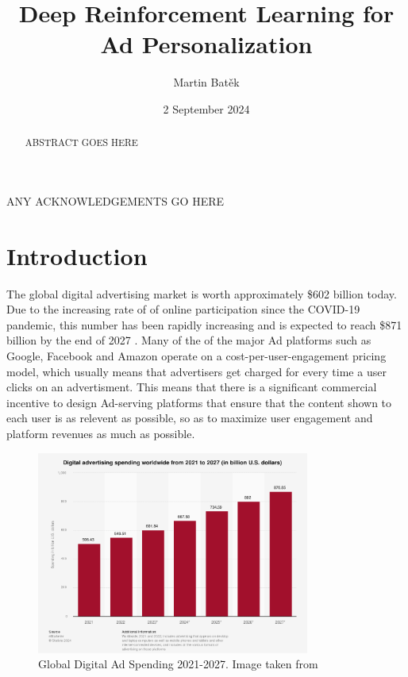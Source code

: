 \documentclass{mldsmsc}
\title{Deep Reinforcement Learning for Ad Personalization}
\author{Martin Bat\v{e}k}
\date{2 September 2024}
\begin{document}
\maketitle


\declaration 


\begin{abstract}
    ABSTRACT GOES HERE
\end{abstract}

\begin{acknowledgements}
    ANY ACKNOWLEDGEMENTS GO HERE
\end{acknowledgements}


\tableofcontents

\mainmatter


\chapter{Introduction}

The global digital advertising market is worth approximately \$602 billion today. Due to the increasing rate of of online participation since the 
COVID-19 pandemic, this number has been rapidly increasing and is expected to reach \$871 billion by the end of 2027 \citep{RefWorks:emarketer2023digital}.
Many of the of the major Ad platforms such as Google, Facebook and Amazon operate on a cost-per-user-engagement pricing model, which usually means that 
advertisers get charged for every time a user clicks on an advertisment. This means that there is
a significant commercial incentive to design Ad-serving platforms that ensure that the content 
shown to each user is as relevent as possible, so as to maximize user engagement and platform revenues
as much as possible.

\begin{figure}[h]
\centering
\includegraphics[width=0.8\textwidth]{../figures/eMarketer - Ad Spending.png}
\caption{Global Digital Ad Spending 2021-2027. Image taken from \cite{RefWorks:emarketer2023digital}}
\label{fig:ad-spending}
\end{figure}
\end{document}
